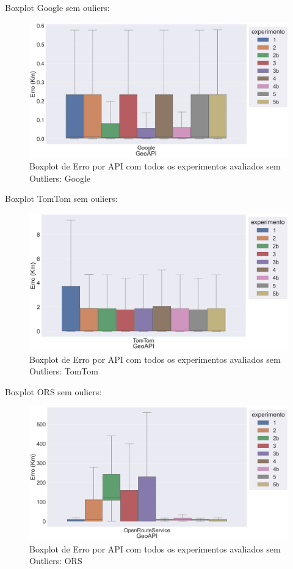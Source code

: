Boxplot Google sem ouliers:

\begin{figure}[h]
    \centering
    \includegraphics[width=\textwidth]{Figuras/boxplotApiGoogleSemOut.png}
    \caption{Boxplot de Erro por API com todos os experimentos avaliados sem Outliers: Google}
    \label{fig:boxplot-api-google-semout}
\end{figure}

Boxplot TomTom sem ouliers:

\begin{figure}[h]
    \centering
    \includegraphics[width=\textwidth]{Figuras/boxplotApiTomtomSemOut.png}
    \caption{Boxplot de Erro por API com todos os experimentos avaliados sem Outliers: TomTom}
    \label{fig:boxplot-api-tomtom-semout}
\end{figure}

Boxplot ORS sem ouliers:

\begin{figure}[h]
    \centering
    \includegraphics[width=\textwidth]{Figuras/boxplotApiOrsSemOut.png}
    \caption{Boxplot de Erro por API com todos os experimentos avaliados sem Outliers: ORS}
    \label{fig:boxplot-api-ors-semout}
\end{figure}
